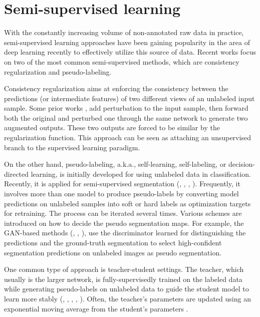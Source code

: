 \section{Semi-supervised learning}
\label{sec:semisup}

With the constantly increasing volume of non-annotated raw data in practice, semi-supervised learning approaches have been gaining popularity in the area of deep learning recently to effectively utilize this source of data.  
Recent works focus on two of the most common semi-supervised methods, which are consistency regularization and pseudo-labeling.

Consistency regularization aims at enforcing the consistency between the predictions (or intermediate features) of two different views of an unlabeled input sample. 
Some prior works \cite{kim2020structuredloss}, \cite{french2019semi} add perturbation to the input sample, then forward both the original and perturbed one through the same network to generate two augmented outputs. These two outputs are forced to be similar by the regularization function. This approach can be seen as attaching an unsupervised branch to the supervised learning paradigm.

On the other hand, pseudo-labeling, a.k.a., self-learning, self-labeling, or decision-directed learning, is initially developed for using unlabeled data in classification. Recently, it is applied for semi-supervised segmentation (\cite{zheng2021rectifying}, \cite{chen2020naivestudent}, \cite{zhu2020improving}, \cite{zoph2020rethinking}). Frequently, it involves more than one model to produce pseudo-labels by converting model predictions on unlabeled samples into soft or hard labels as optimization targets for retraining. The process can be iterated several times. Various schemes are introduced on how to decide the pseudo segmentation maps. For example, the GAN-based methods (\cite{hung2018adversarial}, \cite{mittal2019semi}, \cite{souly2017semisupervised}), use the discriminator learned for distinguishing the predictions and the ground-truth segmentation to select high-confident segmentation predictions on unlabeled images as pseudo segmentation.

One common type of approach is teacher-student settings. The teacher, which usually is the larger network, is fully-supervisedly trained on the labeled data while generating pseudo-labels on unlabeled data to guide the student model to learn more stably (\cite{tarvainen2017meanteachers}, \cite{cui2019semisupervised}, \cite{hang2020localnglobal}, \cite{wang2020double}, \cite{yu2019uncertainty}). Often, the teacher's parameters are updated using an exponential moving average from the student's parameters \cite{cui2019semisupervised}. 

